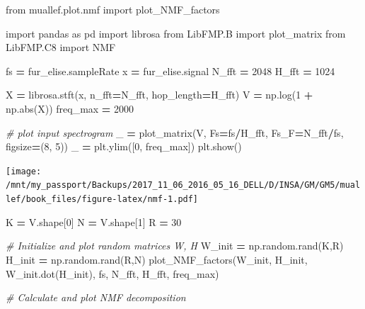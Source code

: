 \documentclass[
  american,
]{article}
\newenvironment{Shaded}{\begin{snugshade}}{\end{snugshade}}
\newcommand{\BuiltInTok}[1]{#1}
\newcommand{\CommentTok}[1]{\textcolor[rgb]{0.56,0.35,0.01}{\textit{#1}}}
\newcommand{\DecValTok}[1]{\textcolor[rgb]{0.00,0.00,0.81}{#1}}
\newcommand{\ImportTok}[1]{#1}
\newcommand{\NormalTok}[1]{#1}
\newcommand{\OperatorTok}[1]{\textcolor[rgb]{0.81,0.36,0.00}{\textbf{#1}}}
\begin{document}
\begin{Shaded}
\begin{Highlighting}[]
\ImportTok{from}\NormalTok{ muallef.plot.nmf }\ImportTok{import}\NormalTok{ plot\_NMF\_factors}

\ImportTok{import}\NormalTok{ pandas }\ImportTok{as}\NormalTok{ pd}
\ImportTok{import}\NormalTok{ librosa}
\ImportTok{from}\NormalTok{ LibFMP.B }\ImportTok{import}\NormalTok{ plot\_matrix}
\ImportTok{from}\NormalTok{ LibFMP.C8 }\ImportTok{import}\NormalTok{ NMF}

\NormalTok{fs }\OperatorTok{=}\NormalTok{ fur\_elise.sampleRate}
\NormalTok{x }\OperatorTok{=}\NormalTok{ fur\_elise.signal}
\NormalTok{N\_fft }\OperatorTok{=} \DecValTok{2048}
\NormalTok{H\_fft }\OperatorTok{=} \DecValTok{1024}

\NormalTok{X }\OperatorTok{=}\NormalTok{ librosa.stft(x, n\_fft}\OperatorTok{=}\NormalTok{N\_fft, hop\_length}\OperatorTok{=}\NormalTok{H\_fft)}
\NormalTok{V }\OperatorTok{=}\NormalTok{ np.log(}\DecValTok{1} \OperatorTok{+}\NormalTok{ np.}\BuiltInTok{abs}\NormalTok{(X))}
\NormalTok{freq\_max }\OperatorTok{=} \DecValTok{2000}

\CommentTok{\# plot input spectrogram}
\NormalTok{\_ }\OperatorTok{=}\NormalTok{ plot\_matrix(V, Fs}\OperatorTok{=}\NormalTok{fs}\OperatorTok{/}\NormalTok{H\_fft, Fs\_F}\OperatorTok{=}\NormalTok{N\_fft}\OperatorTok{/}\NormalTok{fs, figsize}\OperatorTok{=}\NormalTok{(}\DecValTok{8}\NormalTok{, }\DecValTok{5}\NormalTok{))}
\NormalTok{\_ }\OperatorTok{=}\NormalTok{ plt.ylim([}\DecValTok{0}\NormalTok{, freq\_max])}
\NormalTok{plt.show()}
\end{Highlighting}
\end{Shaded}

\texttt{[image: /mnt/my\_passport/Backups/2017\_11\_06\_2016\_05\_16\_DELL/D/INSA/GM/GM5/muallef/book\_files/figure-latex/nmf-1.pdf]}

\begin{Shaded}
\begin{Highlighting}[]
\NormalTok{K }\OperatorTok{=}\NormalTok{ V.shape[}\DecValTok{0}\NormalTok{]}
\NormalTok{N }\OperatorTok{=}\NormalTok{ V.shape[}\DecValTok{1}\NormalTok{]}
\NormalTok{R }\OperatorTok{=} \DecValTok{30}

\CommentTok{\# Initialize and plot random matrices W, H}
\NormalTok{W\_init }\OperatorTok{=}\NormalTok{ np.random.rand(K,R)}
\NormalTok{H\_init }\OperatorTok{=}\NormalTok{ np.random.rand(R,N)}
\NormalTok{plot\_NMF\_factors(W\_init, H\_init, W\_init.dot(H\_init), fs, N\_fft, H\_fft, freq\_max)}

\CommentTok{\# Calculate and plot NMF decomposition}
\end{Highlighting}
\end{Shaded}
\end{document}
